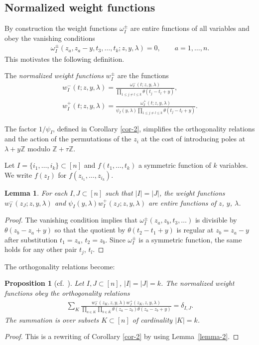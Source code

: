 \documentclass[pdftex]{sigma}
\numberwithin{equation}{section}
\newtheorem{Lemma}[Theorem]{Lemma}
\newtheorem{Proposition}[Theorem]{Proposition}
 { \theoremstyle{definition}
\newtheorem{Definition}[Theorem]{Definition}
\newtheorem{Example}[Theorem]{Example}
\newtheorem{Remark}[Theorem]{Remark} }
\begin{document}
 \subsection{Normalized weight functions}\label{ss-3.9}
 By construction the weight functions $\omega^\pm_I$ are entire functions of all variables and obey the vanishing conditions
 \begin{gather*}
 \omega^\pm_I(z_a,z_a-y,t_3,\dots,t_k;z,y,\lambda)=0, \qquad a=1,\dots,n.
 \end{gather*}
 This motivates the following definition.
 \begin{Definition}
 The {\em normalized weight functions} $w_I^\pm$ are the functions
 \begin{gather*}
 w_I^-(t;z,y,\lambda) =\frac{\omega^-_I(t;z,y,\lambda)}{\prod\limits_{1\leq j\neq l\leq k}\theta(t_j-t_l+y)},\\
 w_I^+(t;z,y,\lambda) = \frac{\omega^+_I(t;z,y,\lambda)}{\psi_I(y,\lambda) \prod\limits_{1\leq j\neq l\leq k}\theta(t_j-t_l+y)}.
 \end{gather*}
 \end{Definition}
 \begin{Remark} The factor $1/\psi_I$, defined in Corollary \ref{cor-2}, simplifies the orthogonality relations and the action of the permutations of the $z_i$ at the cost of introducing poles at $\lambda+y\mathbb Z$ modulo
 $\mathbb Z+\tau\mathbb Z$.
 \end{Remark}
 Let $I=\{i_1,\dots,i_k\}\subset[n]$ and $f(t_1,\dots,t_k)$ a symmetric function of $k$ variables. We write $f(z_I)$ for $f(z_{i_1},\dots,z_{i_k})$.
 \begin{Lemma}\label{lemma-4} For each $I,J\subset[n]$ such that $|I|=|J|$, the weight functions $w_I^-(z_J;z,y,\lambda)$ and $\psi_I(y,\lambda) w_I^+(z_J;z,y,\lambda)$ are entire functions of $z$, $y$, $\lambda$.
 \end{Lemma}
 \begin{proof} The vanishing condition implies that $\omega_I^\pm(z_a,z_b,t_3,\dots)$ is divisible by $\theta(z_b-z_a+y)$ so that the quotient by $\theta(t_2-t_1+y)$ is regular at $z_b=z_a-y$ after substitution $t_1=z_a$, $t_2=z_b$. Since $\omega_I^\pm$ is a symmetric function, the same holds for any other pair $t_j$, $t_l$.
 \end{proof}
 The orthogonality relations become:
 \begin{Proposition}[cf.~\cite{RTV,RTV2,RV2}]\label{p-ortho} Let $I,J\subset[n]$, $|I|=|J|=k$. The normalized weight functions obey the orthogonality relations
 \begin{gather*}
 \sum_{K}\frac{w^-_I(z_K,z,y,\lambda)w^+_J(z_K,z,y,\lambda)} {\prod\limits_{a\in K}\prod\limits_{b\in\bar K}\theta(z_a-z_b)\theta(z_a-z_b+y)} =\delta_{I,J}.
 \end{gather*}
 The summation is over subsets $K\subset[n]$ of cardinality $|K|=k$.
\end{Proposition}
\begin{proof} This is a rewriting of Corollary \ref{cor-2} by using Lemma~\ref{lemma-2}.
\end{proof}
\end{document}

